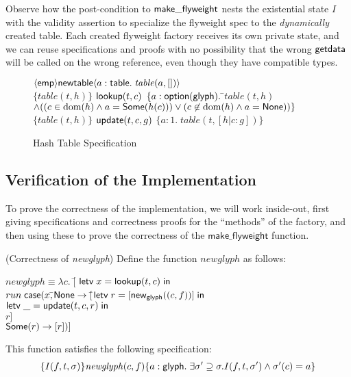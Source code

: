 Observe how the post-condition to $\mathsf{make\_flyweight}$ nests the
existential state $I$ with the validity assertion to specialize the
flyweight spec to the \emph{dynamically} created table. Each created
flyweight factory receives its own private state, and we can reuse
specifications and proofs with no possibility that the wrong
$\mathsf{getdata}$ will be called on the wrong reference, even though
they have compatible types.

\begin{figure}
\begin{specification}
\nextline $\langle{\mathsf{emp}}\rangle{\mathsf{newtable}}\langle{a:\mathsf{table}}.\;{\mathit{table}(a, [])}\rangle$  \\

\nextline $\{\mathit{table}(t, h)\}$
\nextline $\mathsf{lookup}(t, c)$ 
\nextline $\{a:\mathsf{option }{(\mathsf{glyph})}.\;$\=$\mathit{table}(t, h) $ 
\nextline \> $\land ((c \in \mbox{dom}({h}) \land a = \mathsf{Some}(h(c))) \vee (c \not\in \mbox{dom}({h}) \land a = \mathsf{None}))\}$ \\

\nextline $\{\mathit{table}(t, h)\}$
\nextline $\mathsf{update}(t, c, g)$ 
\nextline $\{a:1.\; \mathit{table}(t, [h|c:g])\}$
\end{specification}
\caption{Hash Table Specification}
\label{hash-table-spec}
\end{figure}

\subsection{Verification of the Implementation}

To prove the correctness of the implementation, we will work
inside-out, first giving specifications and correctness proofs for the
``methods'' of the factory, and then using these to prove the correctness
of the $\mathsf{make\_flyweight}$ function. 

\begin{lemma}{(Correctness of \textit{newglyph})}
Define the function $\mathit{newglyph}$ as follows:
\begin{tabbing}
  $\mathit{newglyph} \equiv \lambda c.\; [$\=
     $\mathsf{letv}\;x = \mathsf{lookup}(t,c)\;\mathsf{in}\;$ \\
\>   ${run}\;\mathsf{case}(x, $\=$\mathsf{None} \to [$\=$\mathsf{letv}\;r = [\mathsf{new}_{\mathsf{glyph}}((c,f))]\;\mathsf{in}\;$ \\
\>                                  \>            \>$\mathsf{letv}\;\_ = \mathsf{update}(t, c, r)\;\mathsf{in}\;$ \\
\>                                  \>            \>$r]$\\
\>                                  \>$\mathsf{Some}(r) \to [r])]$ 
\end{tabbing}
\noindent This function satisfies the following specification:
\begin{displaymath}
\{{I(f, t, \sigma)}\}{\mathit{newglyph}(c,f)}\{{a:\mathsf{glyph}}.\;{\exists \sigma' \supseteq \sigma. I(f, t, \sigma') \land \sigma'(c) = a}\}
\end{displaymath}
\end{lemma}

